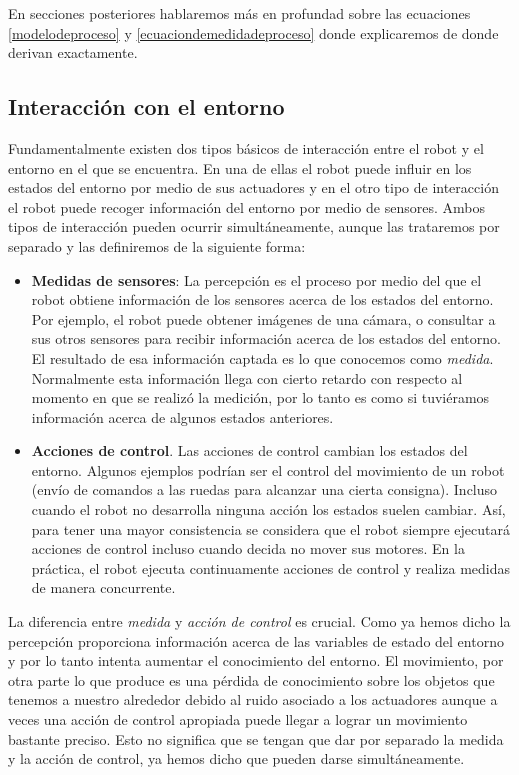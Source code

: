 En secciones posteriores hablaremos más en profundad sobre las ecuaciones \ref{modelodeproceso} y \ref{ecuaciondemedidadeproceso} donde explicaremos de donde derivan exactamente.
\subsection{Interacción con el entorno}
Fundamentalmente existen dos tipos básicos de interacción entre el robot y el entorno en el que se encuentra. 
En una de ellas el robot puede influir en los estados del entorno por medio de sus actuadores y en el otro tipo de interacción el robot puede recoger información del entorno por medio de sensores.
Ambos tipos de interacción pueden ocurrir simultáneamente, aunque las trataremos por separado y las definiremos de la siguiente forma:
\begin{itemize}
    \item \textbf{Medidas de sensores}: La percepción es el proceso por medio del que el robot obtiene información de los sensores acerca de los estados del entorno. 
    Por ejemplo, el robot puede obtener imágenes de una cámara, o consultar a sus otros sensores para recibir información acerca de los estados del entorno. El resultado de esa información captada es lo que conocemos como \textit{medida}. Normalmente esta información llega con cierto retardo con respecto al momento en que se realizó la medición, por lo tanto es como si tuviéramos información acerca de algunos estados anteriores.
    \item \textbf{Acciones de control}. Las acciones de control cambian los estados del entorno.
    Algunos ejemplos podrían ser el control del movimiento de un robot (envío de comandos a las ruedas para alcanzar una cierta consigna).
    Incluso cuando el robot no desarrolla ninguna acción los estados suelen cambiar.
    Así, para tener una mayor consistencia se considera que el robot siempre ejecutará acciones de control incluso cuando decida no mover sus motores. En la práctica, el robot ejecuta continuamente acciones de control y realiza medidas de manera concurrente.
\end{itemize}
La diferencia entre \textit{medida} y \textit{acción de control} es crucial. 
Como ya hemos dicho la percepción proporciona información acerca de las variables de estado del entorno y por lo tanto intenta aumentar el conocimiento del entorno.
El movimiento, por otra parte lo que produce es una pérdida de conocimiento sobre los objetos que tenemos a nuestro alrededor debido al ruido asociado a los actuadores aunque a veces una acción de control apropiada puede llegar a lograr un movimiento bastante preciso. Esto no significa que se tengan que dar por separado la medida y la acción de control, ya hemos dicho que pueden darse simultáneamente.

